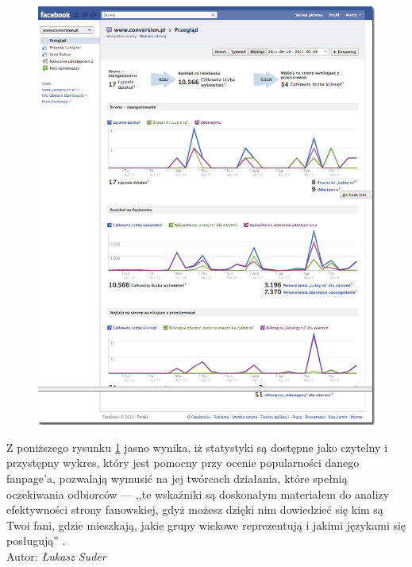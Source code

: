 \begin{figure}[!h]
\centering
    \scalebox{0.41}
    {
        \includegraphics{images/lukasz/dashboard-facebook.png}
    }
    \label{fig:facebook-stat-page}
\end{figure}

Z poniższego rysunku \ref{fig:facebook-stat-page} jasno wynika, iż statystyki są dostępne jako czytelny i przystępny wykres, który jest pomocny przy ocenie popularności danego fanpage’a, pozwalają wymusić na jej twórcach działania, które spełnią oczekiwania odbiorców --- ,,te wskaźniki są doskonałym materiałem do analizy efektywności strony fanowskiej, gdyż możesz dzięki nim dowiedzieć się kim są Twoi fani, gdzie mieszkają, jakie grupy wiekowe reprezentują i jakimi językami się posługują'' \cite{url:darmowe-piwo-przez-facebook}.\\

\hfill Autor: \textit{Łukasz Suder}